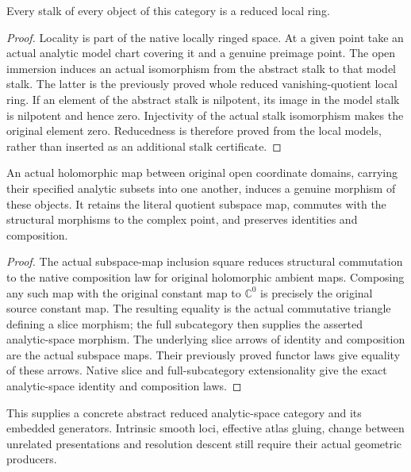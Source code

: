 \begin{theorem}
\label{hir:reduced-analytic-abstract-stalks-reduced}
Every stalk of every object of this category is a reduced local ring.
\leanok
\end{theorem}
\begin{proof}
Locality is part of the native locally ringed space. At a given point
take an actual analytic model chart covering it and a genuine preimage
point. The open immersion induces an actual isomorphism from the
abstract stalk to that model stalk. The latter is the previously proved
whole reduced vanishing-quotient local ring. If an element of the
abstract stalk is nilpotent, its image in the model stalk is nilpotent
and hence zero. Injectivity of the actual stalk isomorphism makes the
original element zero. Reducedness is therefore proved from the local
models, rather than inserted as an additional stalk certificate.
\end{proof}

\begin{theorem}
\label{hir:reduced-analytic-model-holomorphic-morphisms}
An actual holomorphic map between original open coordinate domains,
carrying their specified analytic subsets into one another, induces a
genuine morphism of these objects. It retains the literal quotient
subspace map, commutes with the structural morphisms to the complex
point, and preserves identities and composition.
\leanok
\end{theorem}
\begin{proof}
The actual subspace-map inclusion square reduces structural commutation
to the native composition law for original holomorphic ambient maps.
Composing any such map with the original constant map to $\mathbb C^0$
is precisely the original source constant map. The resulting equality
is the actual commutative triangle defining a slice morphism; the full
subcategory then supplies the asserted analytic-space morphism.
The underlying slice arrows of identity and composition are the actual
subspace maps. Their previously proved functor laws give equality of
these arrows. Native slice and full-subcategory extensionality give
the exact analytic-space identity and composition laws.
\end{proof}

This supplies a concrete abstract reduced analytic-space category and its
embedded generators. Intrinsic smooth loci, effective atlas gluing,
change between unrelated presentations and resolution descent still
require their actual geometric producers.
